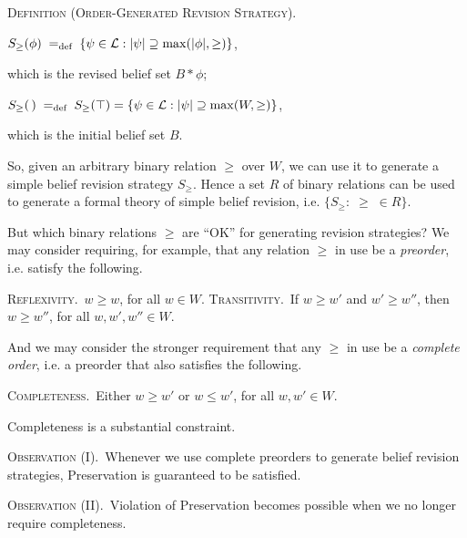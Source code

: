 	\xm \textsc{Definition (Order-Generated Revision Strategy).} 
	
	\xm $S_{\ge}(\phi) \;=_\text{def}\; \{\psi \in {\cal L}: |\psi| \supseteq \max(|\phi|, \ge) \}$, 
	
		\op\xm which is the revised belief set $B * \phi$; \ed

	\xm $S_{\ge}(\,) \;=_\text{def}\; S_{\ge}(\top) = \{\psi \in {\cal L}: |\psi| \supseteq \max(W, \ge) \}$, 
	
		\op\xm which is the initial belief set $B$. \ed

\ed So, given an arbitrary binary relation $\ge$ over $W$, we can use it to generate a simple belief revision strategy $S_{\ge}$. Hence a set $R$ of binary relations can be used to generate a formal theory of simple belief revision, i.e. $\{S_{\ge}: \;\ge\; \in R\}$. 

But which binary relations $\ge$ are ``OK'' for generating revision strategies? We may consider requiring, for example, that any relation $\ge$ in use be a {\em preorder}, i.e. satisfy the following. \op

	\xm \textsc{Reflexivity.}\, $w \ge w$, for all $w \in W$.
	\xm \textsc{Transitivity.}\, If $w \ge w'$ and $w' \ge w''$, then $w \ge w''$, for all $w, w', w'' \in W$.

\ed And we may consider the stronger requirement that any $\ge$ in use be a {\em complete order}, i.e. a preorder that also satisfies the following. \op

	\xm \textsc{Completeness.}\, Either $w \ge w'$ or $w \le w'$, for all $w, w' \in W$.

\ed Completeness is a substantial constraint. \op

	\xm \textsc{Observation (I).}\, Whenever we use complete preorders to generate belief revision strategies, Preservation is guaranteed to be satisfied. 
	
	\xm \textsc{Observation (II).}\, Violation of Preservation becomes possible when we no longer require completeness.

